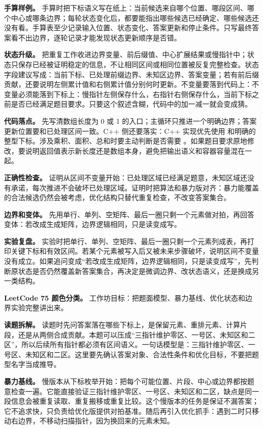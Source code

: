 \textbf{手算样例。} 手算时把下标语义写在纸上：当前候选来自哪个位置、哪段区间、哪个中心或哪条边界；每轮状态变化后，都要能指出哪些候选已经确定、哪些候选还没有看。手算表至少记录输入位置、状态变化、答案更新和停止条件。只写最终答案看不出边界，逐轮记录才能发现状态更新顺序是否错。

\textbf{状态升级。} 把重复工作收进边界变量、前后缀值、中心扩展结果或慢指针中；状态只保存已经被证明稳定的信息，不让相同区间或相同位置被反复完整检查。状态字段建议写成：当前下标、已处理前缀边界、未知区边界、答案变量；若有前后缀贡献，还要说明左侧累计值和右侧累计值分别何时更新。不变量要落到代码上：不变量必须能落到下标上：慢指针左侧保存什么，右指针右侧保存什么，当前下标之前是否已经满足题目要求。只要这个叙述含糊，代码中的加一减一就会变成猜。

\textbf{代码落点。} 先写清数组长度为 0 或 1 的入口；主循环只推进一个明确边界；答案更新位置要和已处理区间一致。C++ 侧还要落实：C++ 实现优先使用  和明确的整型下标。涉及乘积、面积、总和时要主动判断是否需要 。如果题目要求原地修改，要说明返回值表示新长度还是数组本身，避免把输出语义和容器容量混在一起。

\textbf{正确性检查。} 证明从区间不变量开始：已处理区域已经满足题意，未知区域还没有承诺，每次推进不会破坏已处理区域。证明时把算法和暴力版对齐：暴力能覆盖的合法候选仍然会被考虑，优化结构只替代重复检查，不改变答案集合。

\textbf{边界和变体。} 先用单行、单列、空矩阵、最后一圈只剩一个元素做对拍，再回答变体：若改成生成矩阵，边界逻辑相同，只是读变成写。

\textbf{实验复盘。} 实验时把单行、单列、空矩阵、最后一圈只剩一个元素列成表，再打印关键下标和有效区间。若某个元素被写入后又被未来步骤破坏，说明区间不变量没有成立。如果追问变成“若改成生成矩阵，边界逻辑相同，只是读变成写”，先判断原状态是否仍然覆盖新答案集合，再决定是微调边界、改状态语义，还是换成另一类结构。

\noindent\textbf{LeetCode 75 颜色分类。} 工作坊目标：把题面模型、暴力基线、优化状态和边界实验完整讲出来。

\textbf{读题拆解。} 读题时先问答案落在哪些下标上，是保留元素、重排元素、计算片段，还是从两侧合成贡献。本题可以压成“三指针维护零区、一号区、未知区和二区”，所以后续所有指针都必须有区间语义。一句话模型是：三指针维护零区、一号区、未知区和二区。这里要先确认答案对象、合法性条件和优化目标，不要把题型名字当成推导。

\textbf{暴力基线。} 慢版本从下标枚举开始：把每个可能位置、片段、中心或边界都按题意检查一遍。它能直接验证三指针维护零区、一号区、未知区和二区，缺点是同一段信息会被重复读取、重复搬移或重复比较。这个慢版本的任务是保证不漏答案；它不追求快，只负责给优化版提供对拍基准。随后再引入优化抓手：遇到二时只移动右边界，不移动扫描指针，因为换回来的元素未知。

